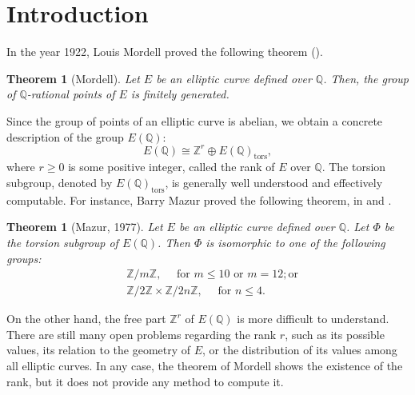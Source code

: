 \documentclass[a4paper, 12pt]{amsart}
\theoremstyle{definition}
\theoremstyle{plain}
\theoremstyle{plain}
\newtheorem{thm0}[defn0]{Theorem}
\theoremstyle{plain}
\theoremstyle{plain}
\theoremstyle{remark}
\theoremstyle{remark}
\theoremstyle{plain}
\newenvironment{theorem}{ \begin{thm0}}{\end{thm0}}
\newcommand{\Q}{\mathbb{Q}}
\newcommand{\Z}{\mathbb{Z}}
\newcommand{\Zmod}[1]{\mathbb{Z}/#1\mathbb{Z}}
\begin{document}
	\maketitle
	
	
	\newpage
	\thispagestyle{empty}
	\tableofcontents
	
	\newpage
	\pagestyle{fancy}
	\thispagestyle{plain}
	\section{Introduction}
	
	In the year 1922, Louis Mordell proved the following theorem (\cite{mordell1922rational}).
	\begin{theorem}[Mordell]
		Let $E$ be an elliptic curve defined over $\Q$. Then, the group of $\Q$-rational points of $E$ is finitely generated.
	\end{theorem}
	Since the group of points of an elliptic curve is abelian, we obtain a concrete description of the group $E(\Q)$:
	\begin{equation*}
		E(\Q)\cong\Z^r\oplus E(\Q)_{\text{tors}},
	\end{equation*}
	where $r\ge 0$ is some positive integer, called the rank of $E$ over $\Q$. The torsion subgroup, denoted by $E(\Q)_{\text{tors}}$, is generally well understood and effectively computable. For instance, Barry Mazur proved the following theorem, in \cite{Mazur_Goldfeld_1978} and \cite{PMIHES_1977__47__33_0}.
	\begin{theorem}[Mazur, 1977]
		Let $E$ be an elliptic curve defined over $\Q$. Let $\Phi$ be the torsion subgroup of $E(\Q)$. Then $\Phi$ is isomorphic to one of the following groups:
		\begin{align*}
			&\Zmod{m},\quad\text{ for }m\le 10 \text{ or } m=12; \text{or}\\
			&\Zmod{2}\times\Zmod{2n},\quad\text{ for }n\le 4.
		\end{align*}
	\end{theorem}
	
	On the other hand, the free part $\Z^r$ of $E(\Q)$ is more difficult to understand. There are still many open problems regarding the rank $r$, such as its possible values, its relation to the geometry of $E$, or the distribution of its values among all elliptic curves. In any case, the theorem of Mordell shows the existence of the rank, but it does not provide any method to compute it.
	
\end{document}
